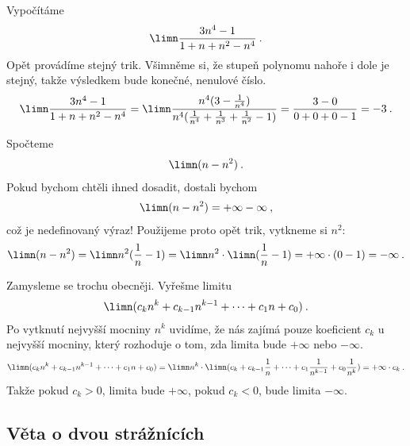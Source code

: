\begin{example}
    Vypočítáme
    \begin{align}
        \limn \frac{3n^4-1}{1+n+n^2-n^4} \:.
    \end{align}
    Opět provádíme stejný trik. Všimněme si, že stupeň polynomu nahoře i dole je stejný, takže výsledkem bude konečné, nenulové číslo.
    \begin{align}
        \limn \frac{3n^4-1}{1+n+n^2-n^4} =
        \limn \frac{n^4(3-\frac{1}{n^4})}{n^4(\frac{1}{n^4}+\frac{1}{n^3}+\frac{1}{n^2}-1)}
        =
        \frac{3-0}{0+0+0-1} = -3 \:.
    \end{align}
\end{example}

\begin{example}
    Spočteme
    \begin{align}
        \limn (n-n^2) \:.
    \end{align}
    Pokud bychom chtěli ihned dosadit, dostali bychom
    \begin{align}
        \limn (n-n^2) = + \infty - \infty \:,
    \end{align}
    což je nedefinovaný výraz!
    Použijeme proto opět trik, vytkneme si $n^2$:
    \begin{align}
        \limn (n-n^2) = \limn n^2 ( \frac{1}{n} - 1) = \limn n^2 \cdot \limn (\frac{1}{n}-1) = + \infty \cdot (0-1) = - \infty \:.
    \end{align}
\end{example}

\begin{example}
    Zamysleme se trochu obecněji. Vyřešme limitu 
    \begin{align}
        \limn (c_k n^k + c_{k-1} n^{k-1} + \cdots + c_1 n + c_0) \:.
    \end{align}
    Po vytknutí nejvyšší mocniny $n^k$ uvidíme, že nás zajímá pouze koeficient $c_k$ u nejvyšší mocniny, který rozhoduje o tom, zda limita bude $+\infty$ nebo $-\infty$.
    \begin{align}
        \limn (c_k n^k + c_{k-1} n^{k-1} + \cdots + c_1 n + c_0) = \limn n^k \cdot \limn (c_k + c_{k-1} \frac{1}{n} + \cdots + c_1 \frac{1}{n^{k-1}} + c_0 \frac{1}{n^k}) = +\infty \cdot c_k \:. 
    \end{align}
    Takže pokud $c_k >0$, limita bude $+\infty$, pokud $c_k<0$, bude limita $-\infty$.
\end{example}

\subsection*{Věta o dvou strážnících}

